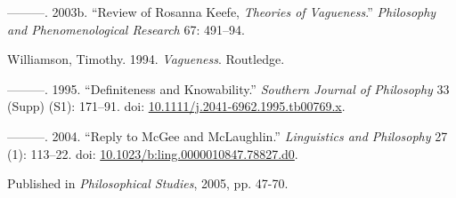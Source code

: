\documentclass[
  11pt,
  letterpaper,
  DIV=11,
  numbers=noendperiod,
  twoside]{scrartcl}
\newlength{\cslhangindent}
\newenvironment{CSLReferences}[2] %
 {\begin{list}{}{%
  \setlength{\itemindent}{0pt}
  \setlength{\leftmargin}{0pt}
  \setlength{\parsep}{0pt}
  \ifodd #1
   \setlength{\leftmargin}{\cslhangindent}
   \setlength{\itemindent}{-1\cslhangindent}
  \fi
  \setlength{\itemsep}{#2\baselineskip}}}
 {\end{list}}
\begin{document}
\begin{CSLReferences}{1}{0}
---------. 2003b. {``Review of Rosanna Keefe, \emph{Theories of
Vagueness}.''} \emph{Philosophy and Phenomenological Research} 67:
491--94.

Williamson, Timothy. 1994. \emph{{Vagueness}}. Routledge.

---------. 1995. {``Definiteness and Knowability.''} \emph{Southern
Journal of Philosophy} 33 (Supp) (S1): 171--91. doi:
\href{https://doi.org/10.1111/j.2041-6962.1995.tb00769.x}{10.1111/j.2041-6962.1995.tb00769.x}.

---------. 2004. {``{Reply to McGee and McLaughlin}.''}
\emph{Linguistics and Philosophy} 27 (1): 113--22. doi:
\href{https://doi.org/10.1023/b:ling.0000010847.78827.d0}{10.1023/b:ling.0000010847.78827.d0}.

\end{CSLReferences}



\noindent Published in\emph{
Philosophical Studies}, 2005, pp. 47-70.
\end{document}
